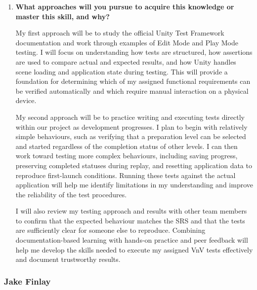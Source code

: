 \documentclass[10pt,titlepage]{article}
\begin{document}
\begin{enumerate}
    \item \textbf{What approaches will you pursue to acquire this
    knowledge or master this skill, and why?}

    My first approach will be to study the official Unity
    Test Framework documentation and work through examples
    of Edit Mode and Play Mode testing. I will focus on
    understanding how tests are structured, how assertions
    are used to compare actual and expected results, and
    how Unity handles scene loading and application state
    during testing. This will provide a foundation for
    determining which of my assigned functional requirements
    can be verified automatically and which require manual
    interaction on a physical device.

    My second approach will be to practice writing and
    executing tests directly within our \progname{} project
    as development progresses. I plan to begin with
    relatively simple behaviours, such as verifying
    that a preparation level can be selected and started
    regardless of the completion status of other levels.
    I can then work toward testing more complex behaviours,
    including saving progress, preserving completed
    statuses during replay, and resetting application
    data to reproduce first-launch conditions.
    Running these tests against the actual application
    will help me identify limitations in my understanding
    and improve the reliability of the test procedures.

    I will also review my testing approach and results
    with other team members to confirm that the expected
    behaviour matches the SRS and that the tests are
    sufficiently clear for someone else to reproduce.
    Combining documentation-based learning with hands-on
    practice and peer feedback will help me develop the
    skills needed to execute my assigned VnV tests
    effectively and document trustworthy results.

\end{enumerate}


\subsubsection*{Jake Finlay}
\end{document}
